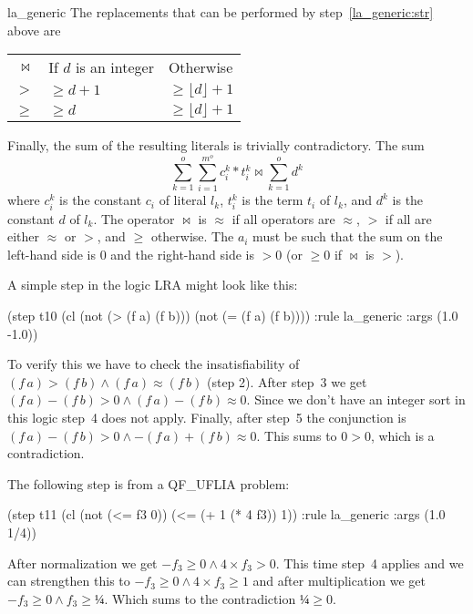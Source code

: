\begin{RuleDescription}{la_generic}
The replacements that can be performed by step~\ref{la_generic:str} above
are

\begin{tabular}{r l l}
$\bowtie$  & If $d$ is an integer  & Otherwise \\
$>$        & $\geq d + 1$  & $\geq \lfloor d\rfloor + 1$  \\
$\geq$     & $\geq d$      & $\geq \lfloor d\rfloor + 1$  \\
\end{tabular}

Finally, the sum of the resulting literals is trivially contradictory.
The sum
\[
    \sum_{k=1}^{o}\sum_{i=1}^{m^o}c_i^k*t_i^k \bowtie \sum_{k=1}^{o}d^k
\]
where $c_i^k$ is the constant $c_i$ of literal $l_k$, $t_i^k$ is the term
$t_i$ of $l_k$, and $d^k$ is the constant $d$ of $l_k$. The operator
$\bowtie$ is $≈$ if all operators are $≈$, $>$ if all are
either $≈$ or $>$, and $\geq$ otherwise. The $a_i$ must be such
that the sum on the left-hand side is $0$ and the right-hand side is $>0$ (or
$\geq 0$ if $\bowtie$ is $>$).
\end{RuleDescription}

\begin{RuleExample}
A simple  step in the logic \textsf{LRA} might look like this:

\begin{AletheVerb}
(step t10 (cl (not (> (f a) (f b))) (not (= (f a) (f b))))
    :rule la_generic :args (1.0 -1.0))
\end{AletheVerb}

To verify this we have to check the insatisfiability of $(f\,a) > (f\,b) \land
(f\,a) ≈ (f\,b)$ (step 2). After step~3 we get $(f\,a) - (f\,b) > 0 \land
(f\,a) - (f\,b) ≈ 0$. Since we don't have an integer sort in this logic step~4 does
not apply. Finally, after step~5 the conjunction is $(f\,a) - (f\,b) > 0 \land
- (f\,a) + (f\,b) ≈ 0$. This sums to $0 > 0$, which is a contradiction.
\end{RuleExample}

\begin{RuleExample}
The following  step is from a \textsf{QF\_UFLIA} problem:
\begin{AletheVerb}
(step t11 (cl (not (<= f3 0)) (<= (+ 1 (* 4 f3)) 1))
    :rule la_generic :args (1.0 1/4))
\end{AletheVerb}
After normalization we get $-f_3 \geq 0 \land 4\times f_3 > 0$.
This time step~4 applies and we can strengthen this to
$-f_3 \geq 0 \land 4\times f_3 \geq 1$ and after multiplication we get
$-f_3 \geq 0 \land f_3 \geq ¼$. Which sums to the contradiction
$¼ \geq 0$.
\end{RuleExample}

